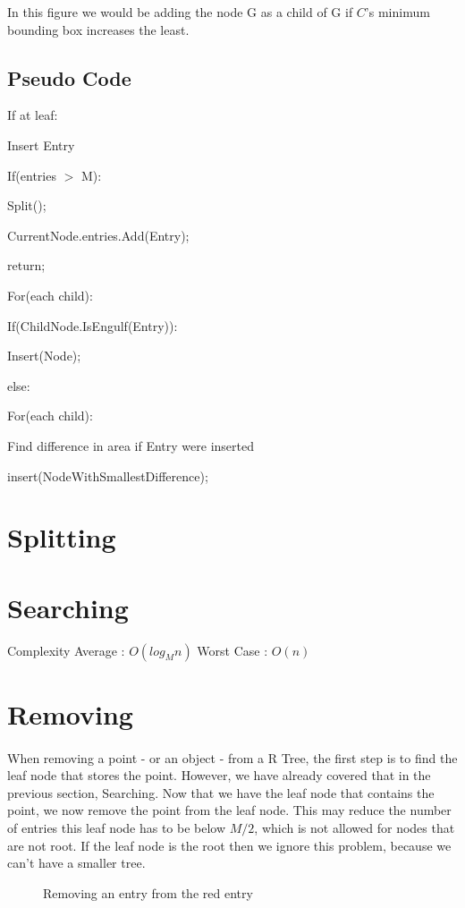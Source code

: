 \documentclass{article}
\begin{document}
In this figure we would be adding the node G as a child of G
if $C$'s minimum bounding box increases the least.
\subsection*{Pseudo Code}
\begin{flushleft}
    
If at leaf:

\quad Insert Entry

\quad If(entries $>$ M):

\quad \quad Split();

\quad CurrentNode.entries.Add(Entry);

\quad return;


For(each child):


\quad If(ChildNode.IsEngulf(Entry)):

 \quad \quad Insert(Node);


else:

\quad For(each child):

    \quad \quad
    Find difference in area if Entry were inserted

    \quad insert(NodeWithSmallestDifference);
\end{flushleft}

\section{Splitting} 

\section{Searching}
Complexity
Average : $O(log_Mn)$
Worst Case : $O(n)$

\section{Removing}
\paragraph{}
When removing a point - or an object - from a R Tree, the first step is to find the leaf node that stores the point.
However, we have already covered that in the previous section, Searching. Now that we have the leaf node that contains
the point, we now remove the point from the leaf node. This may reduce the number of entries this leaf node has to be below
$M/2$, which is not allowed for nodes that are not root. If the leaf node is the root then we ignore this problem, because
we can't have a smaller tree.\\
\begin{figure}
\caption{Removing an entry from the red entry}
\centering
{}
\end{figure}
\end{document}
